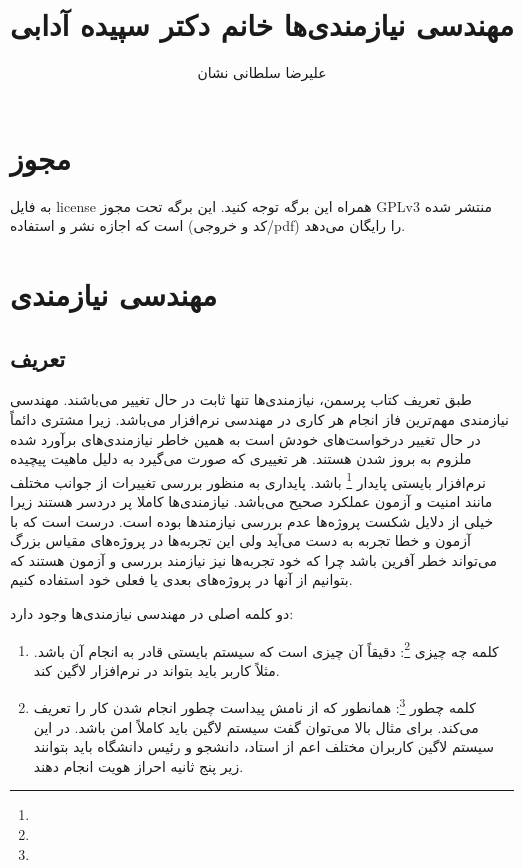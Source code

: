 \documentclass[a4paper]{article}
\title{مهندسی نیازمندی‌ها خانم دکتر سپیده آدابی}
\author{علیرضا سلطانی نشان}
\begin{document}
\maketitle
\tableofcontents

\section{مجوز}

به فایل license همراه این برگه توجه کنید. این برگه تحت مجوز GPLv3 منتشر شده است
که اجازه نشر و استفاده (کد و خروجی/pdf) را رایگان می‌دهد.

\section{مهندسی نیازمندی}

\subsection{تعریف}

طبق تعریف کتاب پرسمن، نیازمندی‌ها تنها ثابت در حال تغییر می‌باشند. مهندسی
نیازمندی مهم‌ترین فاز انجام هر کاری در مهندسی نرم‌افزار می‌باشد. زیرا مشتری
دائماً در حال تغییر درخواست‌های خودش است به همین خاطر نیازمندی‌های برآورد شده
ملزوم به بروز شدن هستند. هر تغییری که صورت می‌گیرد به دلیل ماهیت پیچیده
نرم‌افزار بایستی پایدار \footnote{} باشد. پایداری به منظور بررسی
تغییرات از جوانب مختلف مانند امنیت و آزمون عملکرد صحیح می‌باشد. نیازمندی‌ها
کاملا پر دردسر هستند زیرا خیلی از دلایل شکست پروژه‌ها عدم بررسی نیازمند‌ها بوده
است. درست است که با آزمون و خطا تجربه به دست می‌آید ولی این تجربه‌ها در
پروژه‌های مقیاس بزرگ می‌تواند خطر آفرین باشد چرا که خود تجربه‌ها نیز نیازمند
بررسی و آزمون هستند که بتوانیم از آنها در پروژه‌های بعدی یا فعلی خود استفاده
کنیم.

دو کلمه اصلی در مهندسی نیازمندی‌ها وجود دارد:

\begin{enumerate}
  \item کلمه چه چیزی \footnote{}: دقیقاً‌ آن چیزی است که سیستم بایستی
  قادر به انجام آن باشد. مثلاً کاربر باید بتواند در نرم‌افزار لاگین کند.
  \item کلمه چطور \footnote{}: همانطور که از نامش پیداست چطور انجام شدن
  کار را تعریف می‌کند. برای مثال بالا می‌توان گفت سیستم لاگین باید کاملاً امن
  باشد. در این سیستم لاگین کاربران مختلف اعم از استاد، دانشجو و رئیس دانشگاه
  باید بتوانند زیر پنج ثانیه احراز هویت انجام دهند.
\end{enumerate}
\end{document}
